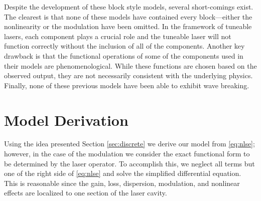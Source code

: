 \documentclass[10pt,twocolumn,a4paper]{article}
\begin{document}
Despite the development of these block style models, several short-comings exist. The clearest is that none of these models have contained every block---either the nonlinearity or the modulation have been omitted. In the framework of tuneable lasers, each component plays a crucial role and the tuneable laser will not function correctly without the inclusion of all of the components. Another key drawback is that the functional operations of some of the components used in their models are phenomenological. While these functions are chosen based on the observed output, they are not necessarily consistent with the underlying physics. Finally, none of these previous models have been able to exhibit wave breaking.


\section{Model Derivation}
\label{sec:model}
Using the idea presented Section \ref{sec:discrete} we derive our model from \eqref{eq:nlse}; however, in the case of the modulation we consider the exact functional form to be determined by the laser operator. To accomplish this, we neglect all terms but one of the right side of \eqref{eq:nlse} and solve the simplified differential equation. This is reasonable since the gain, loss, dispersion, modulation, and nonlinear effects are localized to one section of the laser cavity.
\end{document}

